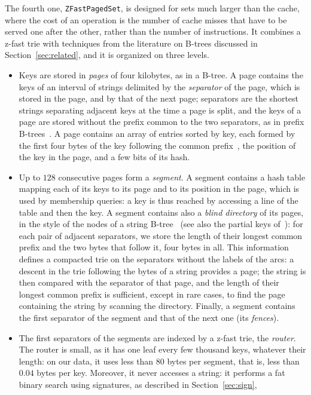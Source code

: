 \documentclass[a4paper]{article}
\newcommand{\?}{\mskip1.5mu}
\begin{document}
The fourth one, \texttt{ZFastPagedSet}, is designed for sets much larger than the cache, where the cost of an operation is 
the number of cache misses that have to be served one after the other, rather than the number of instructions. It combines 
a z-fast trie with techniques from the literature on B-trees discussed in Section~\ref{sec:related}, 
and it is organized on three levels.
\begin{itemize}
\item Keys are stored in \emph{pages} of four kilobytes, as in a B-tree. A page contains the keys of an interval of strings 
delimited by the \emph{separator} of the page, which is stored in the page, and by that of the next page; separators are the shortest strings
separating adjacent keys at the time a page is split, and the keys of a page are stored without the 
prefix common to the two separators, as in prefix B-trees~\cite{Bayer1977Prefix}. A page contains an array of entries sorted by key, each formed by the first four bytes 
of the key following the common prefix~\cite{Graefe2001Btree}, the position of the key in the page, and a few bits of its hash. 
\item Up to $128$ consecutive pages form a \emph{segment}. A segment contains a hash table mapping each of its keys 
to its page and to its position in the page, which is used by membership queries: a key is thus reached by accessing a line of the table 
and then the key. A segment contains also a \emph{blind directory} of its pages, in the style of the nodes of a string B-tree~\cite{FeGSBT}
(see also the partial keys of~\cite{Bohannon2001Main}): for each pair of adjacent separators, we store the length of their longest common prefix 
and the two bytes that follow it, four bytes in all. This information defines a compacted trie on the separators without the labels 
of the arcs: a descent in the trie following the bytes of a string provides a page; the string is then compared with the separator of that page, and
the length of their longest common prefix is sufficient, except in rare cases, to find the page containing the string by scanning the directory. 
Finally, a segment contains the first separator of the segment and that of the next one (its \emph{fences}).
\item The first separators of the segments are indexed by a z-fast trie, the \emph{router}. The router is small, as it has one leaf every few thousand keys,
whatever their length: on our data, it uses less than $80$ bytes per segment, that is, less than $0.04$ bytes per key. 
Moreover, it never accesses a string: it performs a fat binary search using signatures, as described in Section~\ref{sec:sign}, 

\end{itemize}
\end{document}
